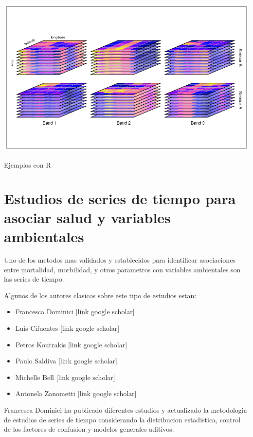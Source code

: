 \documentclass[]{book}
\providecommand{\tightlist}{%
  \setlength{\itemsep}{0pt}\setlength{\parskip}{0pt}}
\begin{document}
\includegraphics{figs/cube2.png}

Ejemplos con R

\hypertarget{estudios-de-series-de-tiempo-para-asociar-salud-y-variables-ambientales}{%
\chapter{Estudios de series de tiempo para asociar salud y variables ambientales}\label{estudios-de-series-de-tiempo-para-asociar-salud-y-variables-ambientales}}

Uno de los metodos mas validados y establecidos para identificar asociaciones entre mortalidad, morbilidad, y otros parametros con variables ambientales son las series de tiempo.

Algunos de los autores clasicos sobre este tipo de estudios estan:

\begin{itemize}
\tightlist
\item
  Francesca Dominici {[}link google scholar{]}
\item
  Luis Cifuentes {[}link google scholar{]}
\item
  Petros Koutrakis {[}link google scholar{]}
\item
  Paulo Saldiva {[}link google scholar{]}
\item
  Michelle Bell {[}link google scholar{]}
\item
  Antonela Zanometti {[}link google scholar{]}
\end{itemize}

Francesca Dominici ha publicado diferentes estudios y actualizado la metodologia de estudios de series de tiempo considerando la distribucion estadistica, control de los factores de confusion y modelos generales aditivos.
\end{document}

